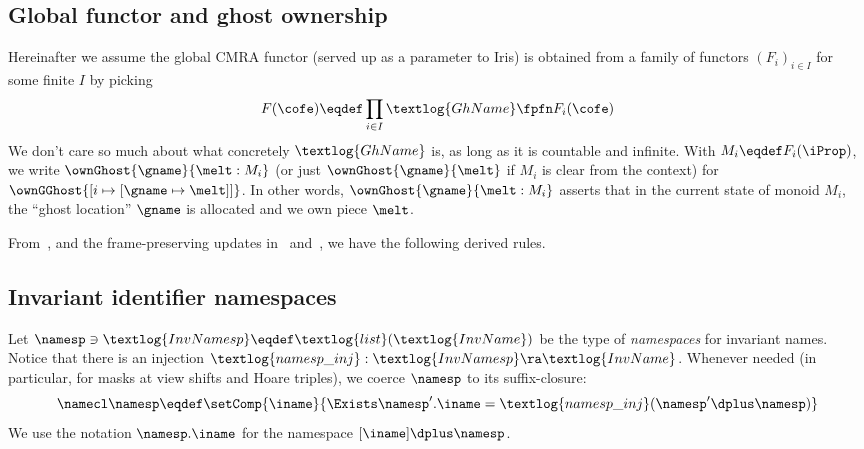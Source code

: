 \subsection{Global functor and ghost ownership}

Hereinafter we assume the global CMRA functor (served up as a parameter to Iris) is obtained from a family of functors $(F_i)_{i \in I}$ for some finite $I$ by picking
\[ F(\cofe) \eqdef \prod_{i \in I} \textlog{GhName} \fpfn F_i(\cofe) \]
We don't care so much about what concretely $\textlog{GhName}$ is, as long as it is countable and infinite.
With $M_i \eqdef F_i(\iProp)$, we write $\ownGhost{\gname}{\melt : M_i}$ (or just $\ownGhost{\gname}{\melt}$ if $M_i$ is clear from the context) for $\ownGGhost{[i \mapsto [\gname \mapsto \melt]]}$.
In other words, $\ownGhost{\gname}{\melt : M_i}$ asserts that in the current state of monoid $M_i$, the ``ghost location'' $\gname$ is allocated and we own piece $\melt$.

From~,  and the frame-preserving updates in~ and~, we have the following derived rules.

\subsection{Invariant identifier namespaces}

Let $\namesp \ni \textlog{InvNamesp} \eqdef \textlog{list}(\textlog{InvName})$ be the type of \emph{namespaces} for invariant names.
Notice that there is an injection $\textlog{namesp\_inj}: \textlog{InvNamesp} \ra \textlog{InvName}$.
Whenever needed (in particular, for masks at view shifts and Hoare triples), we coerce $\namesp$ to its suffix-closure: \[\namecl\namesp \eqdef \setComp{\iname}{\Exists \namesp'. \iname = \textlog{namesp\_inj}(\namesp' \dplus \namesp)}\]
We use the notation $\namesp.\iname$ for the namespace $[\iname] \dplus \namesp$.

